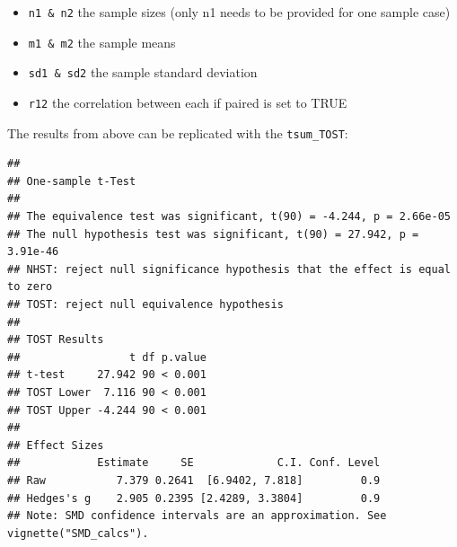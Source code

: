 \documentclass[]{interact}
\theoremstyle{plain}%
\theoremstyle{definition}
\theoremstyle{remark}
\newenvironment{Shaded}{\begin{snugshade}}{\end{snugshade}}
\newcommand{\AttributeTok}[1]{\textcolor[rgb]{0.77,0.63,0.00}{#1}}
\newcommand{\ConstantTok}[1]{\textcolor[rgb]{0.00,0.00,0.00}{#1}}
\newcommand{\FloatTok}[1]{\textcolor[rgb]{0.00,0.00,0.81}{#1}}
\newcommand{\FunctionTok}[1]{\textcolor[rgb]{0.00,0.00,0.00}{#1}}
\newcommand{\NormalTok}[1]{#1}
\newcommand{\OtherTok}[1]{\textcolor[rgb]{0.56,0.35,0.01}{#1}}
\newcommand{\SpecialCharTok}[1]{\textcolor[rgb]{0.00,0.00,0.00}{#1}}
\newcommand{\StringTok}[1]{\textcolor[rgb]{0.31,0.60,0.02}{#1}}
\providecommand{\tightlist}{%
  \setlength{\itemsep}{0pt}\setlength{\parskip}{0pt}}
\def\tightlist{}
\begin{document}
\begin{itemize}
\tightlist
\item
  \texttt{n1\ \&\ n2} the sample sizes (only n1 needs to be provided for
  one sample case)
\item
  \texttt{m1\ \&\ m2} the sample means
\item
  \texttt{sd1\ \&\ sd2} the sample standard deviation
\item
  \texttt{r12} the correlation between each if paired is set to TRUE
\end{itemize}

The results from above can be replicated with the \texttt{tsum\_TOST}:

\begin{Shaded}
\end{Shaded}

\begin{verbatim}
## 
## One-sample t-Test
## 
## The equivalence test was significant, t(90) = -4.244, p = 2.66e-05
## The null hypothesis test was significant, t(90) = 27.942, p = 3.91e-46
## NHST: reject null significance hypothesis that the effect is equal to zero 
## TOST: reject null equivalence hypothesis
## 
## TOST Results 
##                 t df p.value
## t-test     27.942 90 < 0.001
## TOST Lower  7.116 90 < 0.001
## TOST Upper -4.244 90 < 0.001
## 
## Effect Sizes 
##            Estimate     SE             C.I. Conf. Level
## Raw           7.379 0.2641  [6.9402, 7.818]         0.9
## Hedges's g    2.905 0.2395 [2.4289, 3.3804]         0.9
## Note: SMD confidence intervals are an approximation. See vignette("SMD_calcs").
\end{verbatim}
\end{document}
